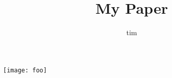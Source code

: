 \documentclass{memoir}
\title{My Paper}
\author{tim}
\date{}
\newenvironment{Figure}
  {\par\medskip\noindent\minipage{\linewidth}}
  {\endminipage\par\medskip}
\begin{document}
\maketitle
\begin{multicols}{2}

\lipsum[2-8]

\begin{Figure}
 \centering
 \texttt{[image: foo]}
\end{Figure}

\lipsum[1]

\end{multicols}
\end{document}
